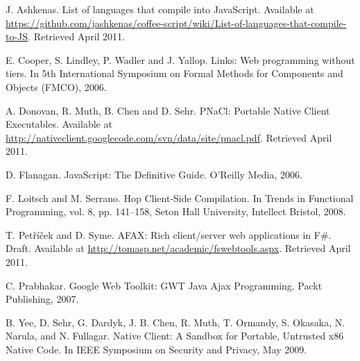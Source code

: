 \documentclass[preprint,10pt]{sigplanconf}
\begin{document}
\begin{thebibliography}{}
\softraggedright

 J. Ashkenas.
List of languages that compile into JavaScript. Available at \url{https://github.com/jashkenas/coffee-script/wiki/List-of-languages-that-compile-to-JS}.
Retrieved April 2011.

 E. Cooper, S. Lindley, P. Wadler and J. Yallop.
Links: Web programming without tiers. In 5th International Symposium on Formal Methods for Components and Objects (FMCO), 2006.

 A. Donovan, R. Muth, B. Chen and D. Sehr.
PNaCl: Portable Native Client Executables. Available at
\url{http://nativeclient.googlecode.com/svn/data/site/pnacl.pdf}. Retrieved April 2011.

 D. Flanagan.
JavaScript: The Definitive Guide. O'Reilly Media, 2006.

 F. Loitsch and M. Serrano.
Hop Client-Side Compilation. In Trends in Functional Programming, vol. 8, pp. 141--158, Seton Hall University, Intellect Bristol, 2008.

 T. Petříček and D. Syme.
AFAX: Rich client/server web applications in F\#. Draft. Available at \url{http://tomasp.net/academic/fswebtools.aspx}. Retrieved April 2011.

 C. Prabhakar.
Google Web Toolkit: GWT Java Ajax Programming. Packt Publishing, 2007.

 B. Yee, D. Sehr, G. Dardyk, J. B. Chen, R. Muth, T. Ormandy, S.
Okasaka, N. Narula, and N. Fullagar. Native Client: A Sandbox for
Portable, Untrusted x86 Native Code. In IEEE Symposium on
Security and Privacy, May 2009.

\end{thebibliography}
\end{document}
